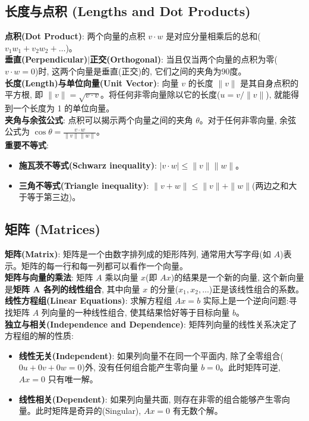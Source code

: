 \documentclass[12pt, a4paper]{ctexart}
\newcommand{\term}[1]{\textbf{\textcolor{blue!80!black}{#1}}}
\newcommand{\emphb}[1]{\textbf{#1}}
\newcommand{\vvc}[1]{\mathbf{#1}}
\begin{document}
\subsection{长度与点积 (Lengths and Dot Products)}
\term{点积(Dot Product)}: 两个向量的点积 $v \cdot w$ 是对应分量相乘后的总和($v_1w_1 + v_2w_2 + \dots$)。\\
\emphb{垂直(Perpendicular)$|$正交(Orthogonal)}: 当且仅当两个向量的点积为零($v \cdot w = 0$)时, 这两个向量是垂直(正交)的, 它们之间的夹角为90度。\\
\emphb{长度(Length)与单位向量(Unit Vector)}: 向量 $v$ 的长度 $\|v\|$ 是其自身点积的平方根, 即 $\|v\| = \sqrt{v \cdot v}$。将任何非零向量除以它的长度($u = v / \|v\|$), 就能得到一个长度为 1 的单位向量。\\
\emphb{夹角与余弦公式}: 点积可以揭示两个向量之间的夹角 $\theta$。对于任何非零向量, 余弦公式为 $\cos \theta = \frac{v \cdot w}{\|v\|\|w\|}$。\\
\emphb{重要不等式}:
\begin{itemize}[nosep]
    \item \term{施瓦茨不等式(Schwarz inequality)}: $|v \cdot w| \le \|v\|\|w\|$。
    \item \term{三角不等式(Triangle inequality)}: $\|v + w\| \le \|v\| + \|w\|$(两边之和大于等于第三边)。
\end{itemize}

\subsection{矩阵 (Matrices)}
\term{矩阵(Matrix)}: 矩阵是一个由数字排列成的矩形阵列, 通常用大写字母(如 $A$)表示。矩阵的每一行和每一列都可以看作一个向量。\\
\emphb{矩阵与向量的乘法}: 矩阵 $A$ 乘以向量 $x$(即 $Ax$)的结果是一个新的向量, 这个新向量是\emphb{矩阵 $\vvc{A}$ 各列的线性组合}, 其中向量 $x$ 的分量($x_1, x_2, \dots$)正是该线性组合的系数。\\
\term{线性方程组(Linear Equations)}: 求解方程组 $Ax = b$ 实际上是一个逆向问题:寻找矩阵 $A$ 列向量的一种线性组合, 使其结果恰好等于目标向量 $b$。\\
\emphb{独立与相关(Independence and Dependence)}: 矩阵列向量的线性关系决定了方程组的解的性质:
\begin{itemize}[nosep]
    \item \term{线性无关(Independent)}: 如果列向量不在同一个平面内, 除了全零组合($0u + 0v + 0w = 0$)外, 没有任何组合能产生零向量 $b=0$。此时矩阵可逆, $Ax = 0$ 只有唯一解。
    \item \term{线性相关(Dependent)}: 如果列向量共面, 则存在非零的组合能够产生零向量。此时矩阵是奇异的(Singular), $Ax = 0$ 有无数个解。
\end{itemize}
\end{document}
